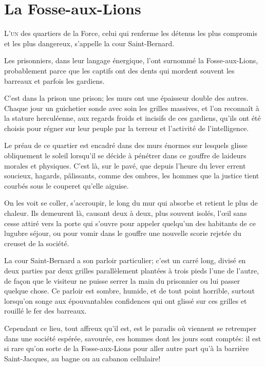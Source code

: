 \chapter{La Fosse-aux-Lions} 

\lettrine{L}{'un} des quartiers de la Force, celui qui renferme les détenus les plus compromis et les plus dangereux, s'appelle la cour Saint-Bernard. 

\zz
Les prisonniers, dans leur langage énergique, l'ont surnommé la Fosse-aux-Lions, probablement parce que les captifs ont des dents qui mordent souvent les barreaux et parfois les gardiens. 

C'est dans la prison une prison; les murs ont une épaisseur double des autres. Chaque jour un guichetier sonde avec soin les grilles massives, et l'on reconnaît à la stature herculéenne, aux regards froids et incisifs de ces gardiens, qu'ils ont été choisis pour régner sur leur peuple par la terreur et l'activité de l'intelligence. 

Le préau de ce quartier est encadré dans des murs énormes sur lesquels glisse obliquement le soleil lorsqu'il se décide à pénétrer dans ce gouffre de laideurs morales et physiques. C'est là, sur le pavé, que depuis l'heure du lever errent soucieux, hagards, pâlissants, comme des ombres, les hommes que la justice tient courbés sous le couperet qu'elle aiguise. 

On les voit se coller, s'accroupir, le long du mur qui absorbe et retient le plus de chaleur. Ils demeurent là, causant deux à deux, plus souvent isolés, l'œil sans cesse attiré vers la porte qui s'ouvre pour appeler quelqu'un des habitants de ce lugubre séjour, ou pour vomir dans le gouffre une nouvelle scorie rejetée du creuset de la société. 

La cour Saint-Bernard a son parloir particulier; c'est un carré long, divisé en deux parties par deux grilles parallèlement plantées à trois pieds l'une de l'autre, de façon que le visiteur ne puisse serrer la main du prisonnier ou lui passer quelque chose. Ce parloir est sombre, humide, et de tout point horrible, surtout lorsqu'on songe aux épouvantables confidences qui ont glissé sur ces grilles et rouillé le fer des barreaux. 

Cependant ce lieu, tout affreux qu'il est, est le paradis où viennent se retremper dans une société espérée, savourée, ces hommes dont les jours sont comptés: il est si rare qu'on sorte de la Fosse-aux-Lions pour aller autre part qu'à la barrière Saint-Jacques, au bagne ou au cabanon cellulaire! 

